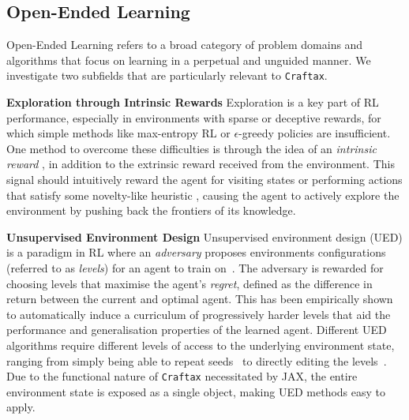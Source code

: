 \documentclass{article}
\theoremstyle{plain}
\theoremstyle{definition}
\theoremstyle{remark}
\begin{document}
\subsection{Open-Ended Learning}

Open-Ended Learning \citep{stanley2017open} refers to a broad category of problem domains and algorithms that focus on learning in a perpetual and unguided manner.  We investigate two subfields that are particularly relevant to \texttt{Craftax}.


\textbf{Exploration through Intrinsic Rewards}
Exploration is a key part of RL performance, especially in environments with sparse or deceptive rewards, for which simple methods like max-entropy RL \citep{sac2018haarn} or $\epsilon$-greedy policies are insufficient.  One method to overcome these difficulties is through the idea of an \textit{intrinsic reward} \citep{schmidhuber1991possibility, oudeyer2007intrinsic, barto2013intrinsic, bellemare2016unifying}, in addition to the extrinsic reward received from the environment.  This signal should intuitively reward the agent for visiting states or performing actions that satisfy some novelty-like heuristic \citep{lehman2008novelty}, causing the agent to actively explore the environment by pushing back the frontiers of its knowledge.

\textbf{Unsupervised Environment Design}
Unsupervised environment design (UED) is a paradigm in RL where an \textit{adversary} proposes environments configurations (referred to as \textit{levels}) for an agent to train on~\citep{dennis2020Emergent,jiang2021Replayguided,holder2022Evolving}. The adversary is rewarded for choosing levels that maximise the agent's \textit{regret}, defined as the difference in return between the current and optimal agent.  This has been empirically shown to automatically induce a curriculum of progressively harder levels that aid the performance and generalisation properties of the learned agent.  Different UED algorithms require different levels of access to the underlying environment state, ranging from simply being able to repeat seeds~\citep{jiang2021Replayguided} to directly editing the levels~\citep{holder2022Evolving}.  Due to the functional nature of \texttt{Craftax} necessitated by JAX, the entire environment state is exposed as a single object, making UED methods easy to apply.
\end{document}

